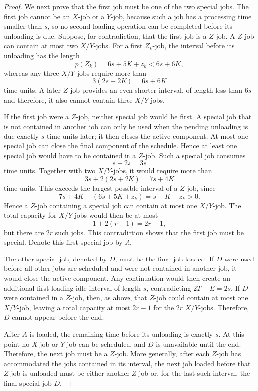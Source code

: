 \documentclass[11pt]{article}
\begin{document}
\begin{proof}
We next prove that the first job must be one of the two special jobs. The first job
cannot be an \(X\)-job or a \(Y\)-job, because such a job has a processing time smaller
than \(s\), so no second loading operation can be completed before its unloading is due.
Suppose, for contradiction, that the first job is a \(Z\)-job. A \(Z\)-job can contain at
most two \(X/Y\)-jobs. For a first \(Z_k\)-job, the interval before its unloading has the length
\[
p(Z_k)=6s+5K+z_k<6s+6K,
\]
whereas any three \(X/Y\)-jobs require more than
\[
3(2s+2K)=6s+6K
\]
time units. A later \(Z\)-job provides an even shorter interval, of length less than
\(6s\) and therefore, it also cannot contain three \(X/Y\)-jobs.

If the first job were a \(Z\)-job, neither special job would be first. A special job that
is not contained in another job can only be used when the pending unloading is due
exactly \(s\) time units later; it then closes the active component. At most one special
job can close the final component of the schedule. Hence at least one special job would
have to be contained in a \(Z\)-job. Such a special job consumes
\[
s+2s=3s
\]
time units. Together with two \(X/Y\)-jobs, it would require more than
\[
3s+2(2s+2K)=7s+4K
\]
time units. This exceeds the largest possible interval of a \(Z\)-job, since
\[
7s+4K-(6s+5K+z_k)=s-K-z_k>0.
\]
Hence a \(Z\)-job containing a special job can contain at most one \(X/Y\)-job. The total
capacity for \(X/Y\)-jobs would then be at most
\[
1+2(r-1)=2r-1,
\]
but there are \(2r\) such jobs. This contradiction shows that the first job must be
special. Denote this first special job by \(A\).

The other special job, denoted by \(D\), must be the final job loaded. If \(D\) were
used before all other jobs are scheduled and were not contained in another job, it would
close the active component. Any continuation would then create an additional
first-loading idle interval of length \(s\), contradicting \(2T-E=2s\). If \(D\) were
contained in a \(Z\)-job, then, as above, that \(Z\)-job could contain at most one
\(X/Y\)-job, leaving a total capacity at most \(2r-1\) for the \(2r\) \(X/Y\)-jobs. Therefore, 
\(D\) cannot appear before the end.

After \(A\) is loaded, the remaining time before its unloading is exactly \(s\). At this
point no \(X\)-job or \(Y\)-job can be scheduled, and \(D\) is unavailable until the end.
Therefore, the next job must be a \(Z\)-job. More generally, after each \(Z\)-job has
accommodated the jobs contained in its interval, the next job loaded before that
\(Z\)-job is unloaded must be either another \(Z\)-job or, for the last such interval, the
final special job \(D\).


\end{proof}
\end{document}
